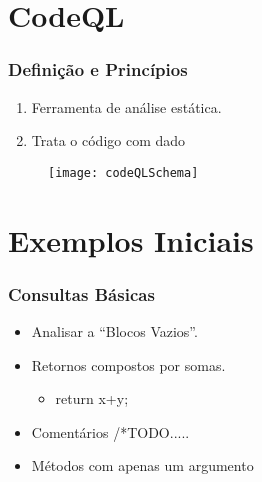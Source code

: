 \documentclass[10pt, aspectratio=169]{beamer}
\begin{document}
\section{CodeQL}
\begin{frame}
  \frametitle{Definição e Princípios} 

  \begin{enumerate}
  \item \vfill Ferramenta de análise estática.
  \item \vfill Trata o código com dado
  \end{enumerate}
\begin{figure} 
	
	\texttt{[image: codeQLSchema]}

\end{figure}
	
 


\end{frame}


\section{Exemplos Iniciais}
\begin{frame}
	\frametitle{Consultas Básicas}
	  \begin{itemize}
		\item  Analisar a ``Blocos Vazios''.
		\item  Retornos compostos por somas.
		\begin{itemize}
			\item return x+y;	
		\end{itemize}
		\item Comentários /*TODO.....
		\item Métodos com apenas um argumento
		
	\end{itemize}
	
	
	
\end{frame}
\end{document}
